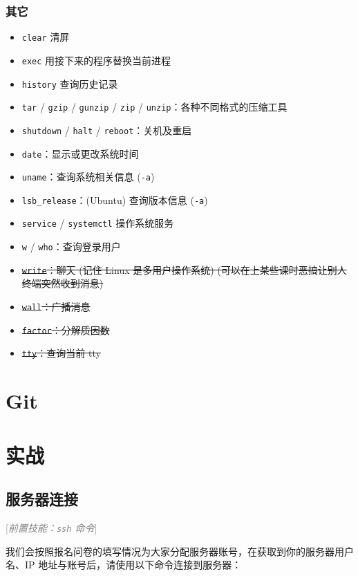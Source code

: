 \documentclass{article}
\begin{document}
	\subsubsection{其它}

	\begin{itemize}
		\itemsep0pt
		\item \texttt{clear} 清屏
		\item \texttt{exec} 用接下来的程序替换当前进程
		\item \texttt{history} 查询历史记录
		\item \texttt{tar} / \texttt{gzip} / \texttt{gunzip} / \texttt{zip} / \texttt{unzip}：各种不同格式的压缩工具
		\item \texttt{shutdown} / \texttt{halt} / \texttt{reboot}：关机及重启
		\item \texttt{date}：显示或更改系统时间
		\item \texttt{uname}：查询系统相关信息 (\texttt{-a})
		\item \texttt{lsb\_release}：(Ubuntu) 查询版本信息 (\texttt{-a})
		\item \texttt{service} / \texttt{systemctl} 操作系统服务
		\item \texttt w / \texttt{who}：查询登录用户
		\item \sout{\texttt{write}：聊天 (记住 Linux 是多用户操作系统) (可以在上某些课时恶搞让别人终端突然收到消息)}
		\item \sout{\texttt{wall}：广播消息}
		\item \sout{\texttt{factor}：分解质因数}
		\item \sout{\texttt{tty}：查询当前 tty}
	\end{itemize}

	\section{Git}

	\section{实战}

	\subsection{服务器连接}
	\label{sss:connserver}

	\textcolor{gray}{[\textit{前置技能：\texttt{ssh} 命令}]}

	我们会按照报名问卷的填写情况为大家分配服务器账号，在获取到你的服务器用户名、IP 地址与账号后，请使用以下命令连接到服务器：
\end{document}
